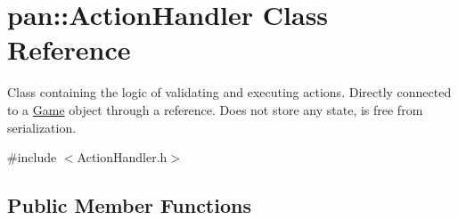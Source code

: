 \hypertarget{classpan_1_1_action_handler}{}\section{pan\+:\+:Action\+Handler Class Reference}
\label{classpan_1_1_action_handler}


Class containing the logic of validating and executing actions. Directly connected to a \hyperlink{classpan_1_1_game}{Game} object through a reference. Does not store any state, is free from serialization.  




{\ttfamily \#include $<$Action\+Handler.\+h$>$}

\subsection*{Public Member Functions}
